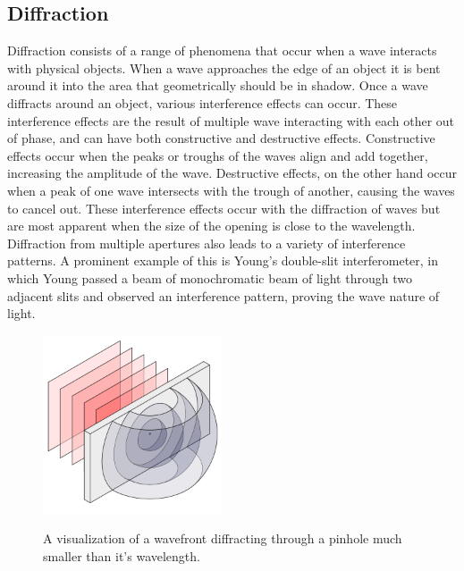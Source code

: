 \documentclass[11pt, oneside]{article}   	%
\begin{document}
\subsection{Diffraction}
Diffraction consists of a range of phenomena that occur when a wave interacts with physical objects. When a wave approaches the edge of an object it is bent around it into the area that geometrically should be in shadow. Once a wave diffracts around an object, various interference effects can occur. These interference effects are the result of multiple wave interacting with each other out of phase, and can have both constructive and destructive effects. Constructive effects occur when the peaks or troughs of the waves align and add together, increasing the amplitude of the wave. Destructive effects, on the other hand occur when a peak of one wave intersects with the trough of another, causing the waves to cancel out. These interference effects occur with the diffraction of waves but are most apparent when the size of the opening is close to the wavelength. Diffraction from multiple apertures also leads to a variety of interference patterns. A prominent example of this is Young's double-slit interferometer, in which Young passed a beam of monochromatic beam of light through two adjacent slits and observed an interference pattern, proving the wave nature of light.
\begin{figure}[h!]
	\centering
	\includegraphics[width=150pt]{img/600px-Diffraction_through_Pinhole.png}
	\caption{A visualization of a wavefront diffracting through a pinhole much smaller than it's wavelength.}\cite{Diffraction}\label{fig:Diff}
\end{figure}
\end{document}

